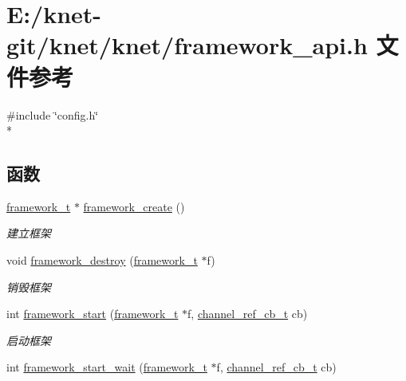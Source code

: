 \hypertarget{a00052}{}\section{E\+:/knet-\/git/knet/knet/framework\+\_\+api.h 文件参考}
\label{a00052}
{\ttfamily \#include \char`\"{}config.\+h\char`\"{}}\\*
\subsection*{函数}
\begin{DoxyCompactItemize}
\item 
\hyperlink{a00047_a6149d769f6f07ed14a40a271c95d8463_a6149d769f6f07ed14a40a271c95d8463}{framework\+\_\+t} $\ast$ \hyperlink{a00093_ga90b29a0c500209cb9b37437a32188a40_ga90b29a0c500209cb9b37437a32188a40}{framework\+\_\+create} ()
\begin{DoxyCompactList}\small\item\em 建立框架 \end{DoxyCompactList}\item 
void \hyperlink{a00093_gad1b6cb17014bfc515f8861bad3198e22_gad1b6cb17014bfc515f8861bad3198e22}{framework\+\_\+destroy} (\hyperlink{a00047_a6149d769f6f07ed14a40a271c95d8463_a6149d769f6f07ed14a40a271c95d8463}{framework\+\_\+t} $\ast$f)
\begin{DoxyCompactList}\small\item\em 销毁框架 \end{DoxyCompactList}\item 
int \hyperlink{a00093_ga7579f69fe8d0ec6887e4594f52cbb883_ga7579f69fe8d0ec6887e4594f52cbb883}{framework\+\_\+start} (\hyperlink{a00047_a6149d769f6f07ed14a40a271c95d8463_a6149d769f6f07ed14a40a271c95d8463}{framework\+\_\+t} $\ast$f, \hyperlink{a00047_ae296ec4d1ce108960de8dcc423956a1d_ae296ec4d1ce108960de8dcc423956a1d}{channel\+\_\+ref\+\_\+cb\+\_\+t} cb)
\begin{DoxyCompactList}\small\item\em 启动框架 \end{DoxyCompactList}\item 
int \hyperlink{a00093_gadd2b49ff4ff090a4490bd0128d00efba_gadd2b49ff4ff090a4490bd0128d00efba}{framework\+\_\+start\+\_\+wait} (\hyperlink{a00047_a6149d769f6f07ed14a40a271c95d8463_a6149d769f6f07ed14a40a271c95d8463}{framework\+\_\+t} $\ast$f, \hyperlink{a00047_ae296ec4d1ce108960de8dcc423956a1d_ae296ec4d1ce108960de8dcc423956a1d}{channel\+\_\+ref\+\_\+cb\+\_\+t} cb)

\end{DoxyCompactItemize}
